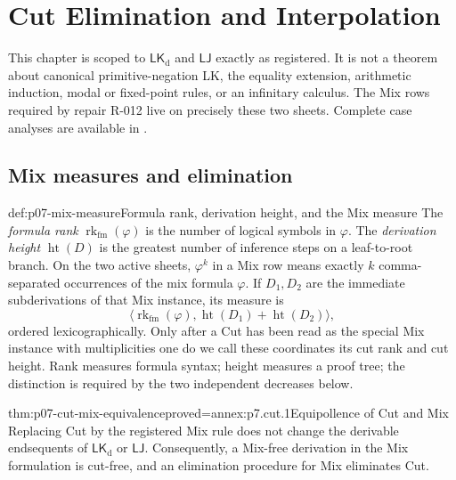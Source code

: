 
\chapter{Cut Elimination and Interpolation}
\label{sec:p07-cut-elimination-and-interpolation}

This chapter is scoped to
\hyperref[sheet:lk-defneg]{\(\mathsf{LK}_{\mathrm d}\)} and
\hyperref[sheet:lj]{\(\mathsf{LJ}\)} exactly as registered.  It is not a
theorem about canonical primitive-negation LK, the equality extension,
arithmetic induction, modal or fixed-point rules, or an infinitary calculus.
The Mix rows required by repair R-012 live on precisely these two sheets.
Complete case analyses are available in
\cite{TroelstraSchwichtenberg2000,NegriVonPlato2001}.

\section{Mix measures and elimination}

\begin{hbdefinition}{def:p07-mix-measure}{Formula rank, derivation height, and the Mix measure}
The \emph{formula rank}
\(\operatorname{rk}_{\mathrm{fm}}(\varphi)\) is the number of logical
symbols in \(\varphi\).
The
\emph{derivation height} \(\operatorname{ht}(D)\) is the greatest number of
inference steps on a leaf-to-root branch.  On the two active sheets,
\(\varphi^k\) in a Mix row means exactly \(k\) comma-separated occurrences
of the mix formula \(\varphi\).  If \(D_1,D_2\) are the immediate
subderivations of that
Mix instance, its measure is
\[
 \bigl\langle \operatorname{rk}_{\mathrm{fm}}(\varphi),
 \operatorname{ht}(D_1)+\operatorname{ht}(D_2)\bigr\rangle,
\]
ordered lexicographically.  Only after a Cut has been read as the special Mix
instance with multiplicities one do we call these coordinates its cut rank
and cut height.  Rank measures formula syntax; height measures a proof tree;
the distinction is required by the two independent decreases below.
\end{hbdefinition}

\begin{hblemma}{thm:p07-cut-mix-equivalence}{proved=annex:p7.cut.1}{Equipollence of Cut and Mix}
Replacing Cut by the registered Mix rule does not change the derivable
endsequents of \(\mathsf{LK}_{\mathrm d}\) or \(\mathsf{LJ}\).
Consequently, a Mix-free derivation in the Mix formulation is cut-free, and
an elimination procedure for Mix eliminates Cut.
\end{hblemma}

